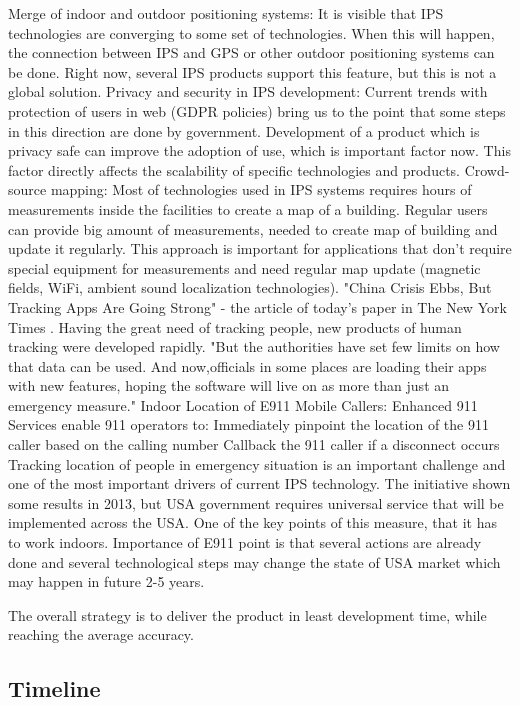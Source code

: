 Merge of indoor and outdoor positioning systems:
It is visible that IPS technologies are converging to some set of technologies. When this will happen, the connection between IPS and GPS or other outdoor positioning systems can be done. Right now, several IPS products support this feature, but this is not a global solution.\cite{Brena2017}
Privacy and security in IPS development:
Current trends with protection of users in web (GDPR policies) bring us to the point that some steps in this direction are done by government. Development of a product which is privacy safe can improve the adoption of use, which is important factor now. This factor directly affects the scalability of specific technologies and products.\cite{Brena2017}
Crowd-source mapping:
Most of technologies used in IPS systems requires hours of measurements inside the facilities to create a map of a building. Regular users can provide big amount of measurements, needed to create map of building and update it regularly.  This approach is important for applications that don't require special equipment for measurements and need regular map update (magnetic fields, WiFi, ambient sound localization technologies).\cite{Brena2017}
"China Crisis Ebbs, But Tracking Apps Are Going Strong" - the article of today's paper in The New York Times \cite{Tracking_Apps_times}.
Having the great need of tracking people, new products of human tracking were developed rapidly. "But the authorities have set few limits on how that data can be used. And now,officials in some places are loading their apps with new features, hoping the software will live on as more than just an emergency measure."
Indoor Location of E911 Mobile Callers:
Enhanced 911 Services enable 911 operators to:
Immediately pinpoint the location of the 911 caller based on the calling number
Callback the 911 caller if a disconnect occurs
Tracking location of people in emergency situation is an important challenge and one of the most important drivers of current IPS technology.
The initiative shown some results in 2013, but USA government requires universal service that will be implemented across the USA. One of the key points of this measure, that it has to work indoors. Importance of E911 point is that several actions are already done and several technological steps may change the state of USA market which may happen in future 2-5 years.

The overall strategy is to deliver the product in least development time, while reaching the average accuracy.

\subsection{Timeline}

